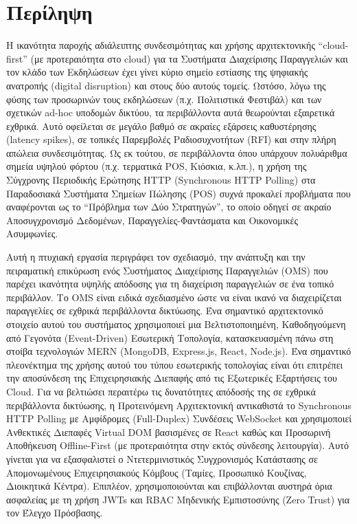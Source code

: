 \chapter*{Περίληψη}
\begin{abstractGr}
  Η ικανότητα παροχής αδιάλειπτης συνδεσιμότητας και χρήσης αρχιτεκτονικής ``cloud-first'' (με προτεραιότητα στο cloud) για τα Συστήματα Διαχείρισης Παραγγελιών και τον κλάδο των Εκδηλώσεων έχει γίνει κύριο σημείο εστίασης της ψηφιακής ανατροπής (digital disruption) και στους δύο αυτούς τομείς. Ωστόσο, λόγω της φύσης των προσωρινών τους εκδηλώσεων (π.χ. Πολιτιστικά Φεστιβάλ) και των σχετικών ad-hoc υποδομών δικτύου, τα περιβάλλοντα αυτά θεωρούνται εξαιρετικά εχθρικά. Αυτό οφείλεται σε μεγάλο βαθμό σε ακραίες εξάρσεις καθυστέρησης (latency spikes), σε τοπικές Παρεμβολές Ραδιοσυχνοτήτων (RFI) και στην πλήρη απώλεια συνδεσιμότητας. Ως εκ τούτου, σε περιβάλλοντα όπου υπάρχουν πολυάριθμα σημεία υψηλού φόρτου (π.χ. τερματικά POS, Κιόσκια, κ.λπ.), η χρήση της Σύγχρονης Περιοδικής Ερώτησης HTTP (Synchronous HTTP Polling) στα Παραδοσιακά Συστήματα Σημείων Πώλησης (POS) συχνά προκαλεί προβλήματα που αναφέρονται ως το ``Πρόβλημα των Δύο Στρατηγών'', το οποίο οδηγεί σε ακραίο Αποσυγχρονισμό Δεδομένων, Παραγγελίες-Φαντάσματα και Οικονομικές Ασυμφωνίες.
  
  Αυτή η πτυχιακή εργασία περιγράφει τον σχεδιασμό, την ανάπτυξη και την πειραματική επικύρωση ενός Συστήματος Διαχείρισης Παραγγελιών (OMS) που παρέχει ικανότητα υψηλής απόδοσης για τη διαχείριση παραγγελιών σε ένα τοπικό περιβάλλον. Το OMS είναι ειδικά σχεδιασμένο ώστε να είναι ικανό να διαχειρίζεται παραγγελίες σε εχθρικά περιβάλλοντα δικτύωσης. Ένα σημαντικό αρχιτεκτονικό στοιχείο αυτού του συστήματος χρησιμοποιεί μια Βελτιστοποιημένη, Καθοδηγούμενη από Γεγονότα (Event-Driven) Εσωτερική Τοπολογία, κατασκευασμένη πάνω στη στοίβα τεχνολογιών MERN (MongoDB, Express.js, React, Node.js). Ένα σημαντικό πλεονέκτημα της χρήσης αυτού του τύπου εσωτερικής τοπολογίας είναι ότι επιτρέπει την αποσύνδεση της Επιχειρησιακής Διεπαφής από τις Εξωτερικές Εξαρτήσεις του Cloud. Για να βελτιώσει περαιτέρω τις δυνατότητες απόδοσής της σε εχθρικά περιβάλλοντα δικτύωσης, η Προτεινόμενη Αρχιτεκτονική αντικαθιστά το Synchronous HTTP Polling με Αμφίδρομες (Full-Duplex) Συνδέσεις WebSocket και χρησιμοποιεί Ανθεκτικές Διεπαφές Virtual DOM βασισμένες σε React καθώς και Προσωρινή Αποθήκευση Offline-First (με προτεραιότητα στην εκτός σύνδεσης λειτουργία). Αυτό γίνεται για να εξασφαλιστεί ο Ντετερμινιστικός Συγχρονισμός Κατάστασης σε Απομονωμένους Επιχειρησιακούς Κόμβους (Ταμίες, Προσωπικό Κουζίνας, Διοικητικά Κέντρα). Επιπλέον, χρησιμοποιούνται και επιβάλλονται αυστηρά όρια ασφαλείας με τη χρήση JWTs και RBAC Μηδενικής Εμπιστοσύνης (Zero Trust) για τον Έλεγχο Πρόσβασης.


\end{abstractGr}
